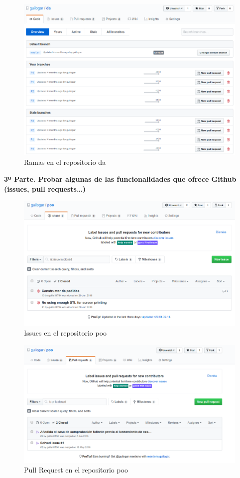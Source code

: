 \documentclass{article}
\begin{document}
\begin{figure}[H]
\centering
\includegraphics[width=0.7\linewidth]{./2_2}
\caption{Ramas en el repositorio da}
\end{figure}

\textbf{3º Parte. Probar algunas de las funcionalidades que ofrece Github (issues, pull requests\ldots)}\\

\begin{figure}[H]
\centering
\includegraphics[width=0.7\linewidth]{./3_1}
\caption{Issues en el repositorio poo}
\end{figure}

\begin{figure}[H]
\centering
\includegraphics[width=0.7\linewidth]{./3_2}
\caption{Pull Request en el repositorio poo}
\end{figure}
\end{document}
